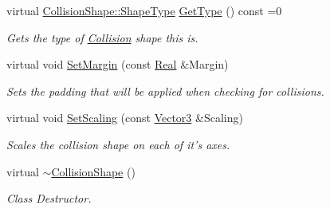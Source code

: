 \begin{DoxyCompactItemize}
virtual \hyperlink{classMezzanine_1_1CollisionShape_ad04186055565998879b64176d6dd100d}{CollisionShape::ShapeType} \hyperlink{classMezzanine_1_1CollisionShape_a27e5055f81cb8fb6d65a6c9f8dc73b69}{GetType} () const =0
\begin{DoxyCompactList}\small\item\em Gets the type of \hyperlink{classMezzanine_1_1Collision}{Collision} shape this is. \item\end{DoxyCompactList}\item 
virtual void \hyperlink{classMezzanine_1_1CollisionShape_a3884d005f857180185a44c99e55024e3}{SetMargin} (const \hyperlink{namespaceMezzanine_a726731b1a7df72bf3583e4a97282c6f6}{Real} \&Margin)
\begin{DoxyCompactList}\small\item\em Sets the padding that will be applied when checking for collisions. \item\end{DoxyCompactList}\item 
virtual void \hyperlink{classMezzanine_1_1CollisionShape_a1017c09132113afe0f33fe9b2e7b9def}{SetScaling} (const \hyperlink{classMezzanine_1_1Vector3}{Vector3} \&Scaling)
\begin{DoxyCompactList}\small\item\em Scales the collision shape on each of it's axes. \item\end{DoxyCompactList}\item 
\hypertarget{classMezzanine_1_1CollisionShape_a55253f27f2f64baf9a21fb440cfeaea6}{
virtual \hyperlink{classMezzanine_1_1CollisionShape_a55253f27f2f64baf9a21fb440cfeaea6}{$\sim$CollisionShape} ()}
\label{classMezzanine_1_1CollisionShape_a55253f27f2f64baf9a21fb440cfeaea6}

\begin{DoxyCompactList}\small\item\em Class Destructor. \item\end{DoxyCompactList}\end{DoxyCompactItemize}
